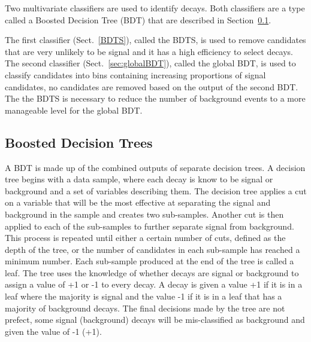Two multivariate classifiers are used to identify \bsmumu decays. Both classifiers are a type called a Boosted Decision Tree (BDT) that are described in Section~\ref{sec:GeneralBDT}. %

The first classifier (Sect.~\ref{BDTS}), called the BDTS, is used to remove candidates that are very unlikely to be signal and it has a high efficiency to select \bmumu decays. The second classifier (Sect.~\ref{sec:globalBDT}), called the global BDT, is used to classify candidates into bins containing increasing proportions of signal candidates, no candidates are removed based on the output of the second BDT. The the BDTS is necessary to reduce the number of background events to a more manageable level for the global BDT.

\subsection{Boosted Decision Trees}
\label{sec:GeneralBDT}
A BDT is made up of the combined outputs of separate decision trees. A decision tree begins with a data sample, where each decay is know to be signal or background and a set of variables describing them. The decision tree applies a cut on a variable that will be the most effective at separating the signal and background in the sample and creates two sub-samples. Another cut is then applied to each of the sub-samples to further separate signal from background. This process is repeated until either a certain number of cuts, defined as the depth of the tree, or the number of candidates in each sub-sample has reached a minimum number. Each sub-sample produced at the end of the tree is called a leaf. The tree uses the knowledge of whether decays are signal or background to assign a value of +1 or -1 to every decay. A decay is given a value +1 if it is in a leaf where the majority is signal and the value -1 if it is in a leaf that has a majority of background decays. The final decisions made by the tree are not prefect, some signal (background) decays will be mis-classified as background and given the value of -1 (+1). %

